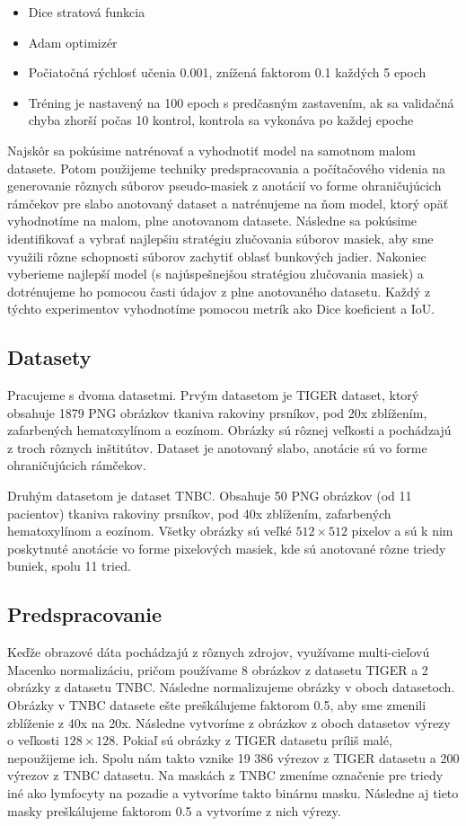 \begin{itemize}
    \item Dice stratová funkcia
    \item Adam optimizér
    \item Počiatočná rýchlosť učenia 0.001, znížená faktorom 0.1 každých 5 epoch
    \item Tréning je nastavený na 100 epoch s predčasným zastavením, ak sa validačná chyba zhorší počas 10 kontrol, kontrola sa vykonáva po každej epoche
\end{itemize}

Najskôr sa pokúsime natrénovať a vyhodnotiť model na samotnom malom datasete. Potom použijeme techniky predspracovania a počítačového videnia na generovanie rôznych súborov pseudo-masiek z anotácií vo forme ohraničujúcich rámčekov pre slabo anotovaný dataset a natrénujeme na ňom model, ktorý opäť vyhodnotíme na malom, plne anotovanom datasete. Následne sa pokúsime identifikovať a vybrať najlepšiu stratégiu zlučovania súborov masiek, aby sme využili rôzne schopnosti súborov zachytiť oblasť bunkových jadier. Nakoniec vyberieme najlepší model (s najúspešnejšou stratégiou zlučovania masiek) a dotrénujeme ho pomocou časti údajov z plne anotovaného datasetu. Každý z týchto experimentov vyhodnotíme pomocou metrík ako Dice koeficient a IoU.

\subsection{Datasety}
Pracujeme s dvoma datasetmi. Prvým datasetom je TIGER dataset, ktorý obsahuje 1879 PNG obrázkov tkaniva rakoviny prsníkov, pod 20x zblížením, zafarbených hematoxylínom a eozínom. Obrázky sú rôznej veľkosti a pochádzajú z troch rôznych inštitútov. Dataset je anotovaný slabo, anotácie sú vo forme ohraničujúcich rámčekov.

Druhým datasetom je dataset TNBC. Obsahuje 50 PNG obrázkov (od 11 pacientov) tkaniva rakoviny prsníkov, pod 40x zblížením, zafarbených hematoxylínom a eozínom. Všetky obrázky sú veľké $512\!\times\!512$ pixelov a sú k nim poskytnuté anotácie vo forme pixelových masiek, kde sú anotované rôzne triedy buniek, spolu 11 tried.

\subsection{Predspracovanie}
Keďže obrazové dáta pochádzajú z rôznych zdrojov, využívame multi-cieľovú Macenko normalizáciu, pričom používame 8 obrázkov z datasetu TIGER a 2 obrázky z datasetu TNBC. Následne normalizujeme obrázky v oboch datasetoch. Obrázky v TNBC datasete ešte preškálujeme faktorom 0.5, aby sme zmenili zblíženie z 40x na 20x. Následne vytvoríme z obrázkov z oboch datasetov výrezy o veľkosti $128\!\times\!128$. Pokiaľ sú obrázky z TIGER datasetu príliš malé, nepoužijeme ich. Spolu nám takto vznike 19 386 výrezov z TIGER datasetu a 200 výrezov z TNBC datasetu. Na maskách z TNBC zmeníme označenie pre triedy iné ako lymfocyty na pozadie a vytvoríme takto binárnu masku. Následne aj tieto masky preškálujeme faktorom 0.5 a vytvoríme z nich výrezy.

